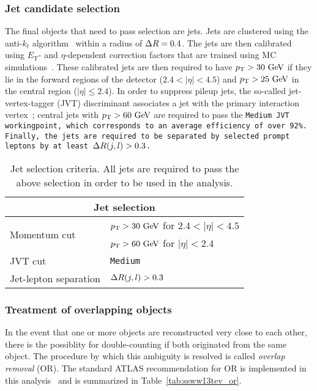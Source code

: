 

\subsubsection{Jet candidate selection}
The final objects that need to pass selection are jets.
Jets are clustered using the anti-$k_t$ algorithm~\cite{2008.antikt} within a radius of $\Delta R = 0.4$.
The jets are then calibrated using $E_\textrm{T}$- and $\eta$-dependent correction factors that are trained using MC simulations~\cite{2017.jet-energy-scale-13tev}.
These calibrated jets are then required to have $\pt > 30\gev$ if they lie in the forward regions of the detector ($2.4 < |\eta| < 4.5$) and $\pt > 25\gev$ in the central region ($|\eta| \le 2.4$).
In order to suppress pileup jets, the so-called jet-vertex-tagger (JVT) discriminant associates a jet with the primary interaction vertex~\cite{2014.jet-vertex-tagger}; central jets with $\pt > 60\gev$ are required to pass the \tt{Medium} JVT workingpoint, which corresponds to an average efficiency of over 92\%. %
Finally, the jets are required to be separated by selected prompt leptons by at least $\Delta R(j,l) > 0.3$.

\begin{table}[htbp]
  \centering
  \begin{tabular}{l l}
    \multicolumn{2}{c}{Jet selection} \\ 
    \hline\hline
    \multirow{2}{*}{Momentum cut} & $\pt > 30\gev$ for $2.4 < |\eta| < 4.5$ \\
                                  & $\pt > 60\gev$ for $|\eta| < 2.4$ \\
    JVT cut                       & \tt{Medium}\\
    Jet-lepton separation         & $\Delta R(j,l) > 0.3$ \\
    \hline
  \end{tabular}
  \caption{Jet selection criteria.  All jets are required to pass the above selection in order to be used in the analysis.}
  \label{tab:ssww13tev_jet_selection}
\end{table}

\subsubsection{Treatment of overlapping objects}\label{ssww13tev:overlap_removal}
In the event that one or more objects are reconstructed very close to each other, there is the possiblity for double-counting if both originated from the same object.
The procedure by which this ambiguity is resolved is called \emph{overlap removal} (OR).
The standard ATLAS recommendation for OR is implemented in this analysis~\cite{2014.atlas-overlap-removal, 2018.atlas-wboson-top} and is summarized in Table~\ref{tab:ssww13tev_or}.

